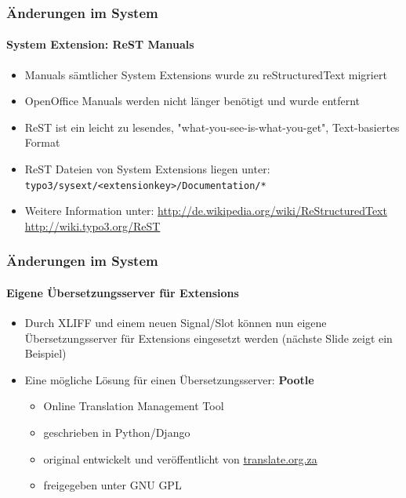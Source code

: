 \begin{frame}[fragile]
	\frametitle{Änderungen im System}
	\framesubtitle{System Extension: ReST Manuals}

	\begin{itemize}
		\item Manuals sämtlicher System Extensions wurde zu reStructuredText migriert
		\item OpenOffice Manuals werden nicht länger benötigt und wurde entfernt
		\item ReST ist ein leicht zu lesendes, "what-you-see-is-what-you-get", Text-basiertes Format
		\item ReST Dateien von System Extensions liegen unter:\newline
			\texttt{typo3/sysext/<extensionkey>/Documentation/*}

		\item Weitere Information unter:\newline
			\url{http://de.wikipedia.org/wiki/ReStructuredText}\newline
			\url{http://wiki.typo3.org/ReST}

	\end{itemize}

\end{frame}


\begin{frame}[fragile]
	\frametitle{Änderungen im System}
	\framesubtitle{Eigene Übersetzungsserver für Extensions}

	\begin{itemize}
		\item Durch XLIFF und einem neuen Signal/Slot können nun eigene Übersetzungsserver für Extensions eingesetzt werden\newline
			\small(nächste Slide zeigt ein Beispiel)\normalsize
		\item Eine mögliche Lösung für einen Übersetzungsserver: \textbf{Pootle}

			\begin{itemize}
				\item Online Translation Management Tool
				\item geschrieben in Python/Django
				\item original entwickelt und veröffentlicht von \url{translate.org.za}
				\item freigegeben unter GNU GPL
			\end{itemize}

	\end{itemize}

\end{frame}

